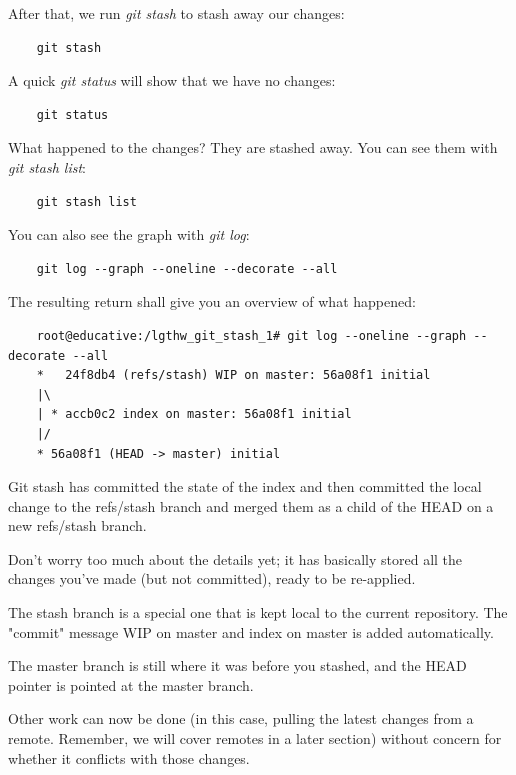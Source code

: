 \documentclass{report}
\begin{document}
After that, we run \textit{git stash} to stash away our changes:

\begin{lstlisting}
    git stash
\end{lstlisting}

A quick \textit{git status} will show that we have no changes:

\begin{lstlisting}
    git status
\end{lstlisting}

What happened to the changes? They are stashed away. You can see them with \textit{git stash list}:

\begin{lstlisting}
    git stash list
\end{lstlisting}

You can also see the graph with \textit{git log}:

\begin{lstlisting}
    git log --graph --oneline --decorate --all
\end{lstlisting}

The resulting return shall give you an overview of what happened:

\begin{lstlisting}
    root@educative:/lgthw_git_stash_1# git log --oneline --graph --decorate --all
    *   24f8db4 (refs/stash) WIP on master: 56a08f1 initial
    |\  
    | * accb0c2 index on master: 56a08f1 initial
    |/  
    * 56a08f1 (HEAD -> master) initial
\end{lstlisting}

Git stash has committed the state of the index and then committed the local change to the refs/stash branch and merged them as a child of the HEAD on a new refs/stash branch.

Don't worry too much about the details yet; it has basically stored all the changes you've made (but not committed), ready to be re-applied.

The stash branch is a special one that is kept local to the current repository. The "commit" message WIP on master and index on master is added automatically.

The master branch is still where it was before you stashed, and the HEAD pointer is pointed at the master branch.

Other work can now be done (in this case, pulling the latest changes from a remote. Remember, we will cover remotes in a later section) without concern for whether it conflicts with those changes.
\end{document}
